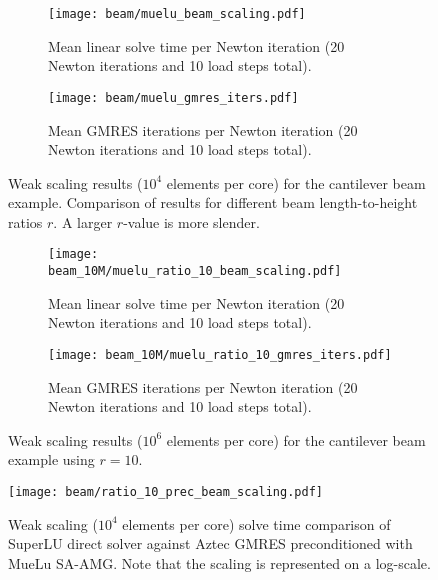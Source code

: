 \begin{figure}[ht]
\begin{subfigure}{\columnwidth}
    \centering
    \texttt{[image: beam/muelu\_beam\_scaling.pdf]}
    \caption{Mean linear solve time per Newton iteration (20 Newton iterations and 10 load steps total).}
    \label{fig:weak_scaling_time}
\end{subfigure}
\begin{subfigure}{\columnwidth}
    \centering
    \texttt{[image: beam/muelu\_gmres\_iters.pdf]}
    \caption{Mean GMRES iterations per Newton iteration (20 Newton iterations and 10 load steps total).}
    \label{fig:weak_scaling_gmres}
\end{subfigure}
\caption{Weak scaling results (\texttildelow$10^4$ elements per core) for the cantilever beam example. Comparison of results for different beam length-to-height ratios $r$. A larger $r$-value is more slender.}
\label{fig:weak_scaling}
\end{figure}

\begin{figure}[ht]
    \begin{subfigure}{\columnwidth}
        \centering
        \texttt{[image: beam\_10M/muelu\_ratio\_10\_beam\_scaling.pdf]}
        \caption{Mean linear solve time per Newton iteration (20 Newton iterations and 10 load steps total).}
    \end{subfigure}
    \begin{subfigure}{\columnwidth}
        \centering
        \texttt{[image: beam\_10M/muelu\_ratio\_10\_gmres\_iters.pdf]}
        \caption{Mean GMRES iterations per Newton iteration (20 Newton iterations and 10 load steps total).}
    \end{subfigure}
    \caption{Weak scaling results (\texttildelow$10^6$ elements per core) for the cantilever beam example using $r = 10$.}
    \label{fig:weak_scaling_1M}
\end{figure}

\begin{figure}[ht]
    \centering
    \texttt{[image: beam/ratio\_10\_prec\_beam\_scaling.pdf]}
    \caption{Weak scaling (\texttildelow$10^4$ elements per core) solve time comparison of SuperLU direct solver against Aztec GMRES preconditioned with MueLu SA-AMG. Note that the scaling is represented on a log-scale.}
    \label{fig:superlu}
\end{figure}

\clearpage

